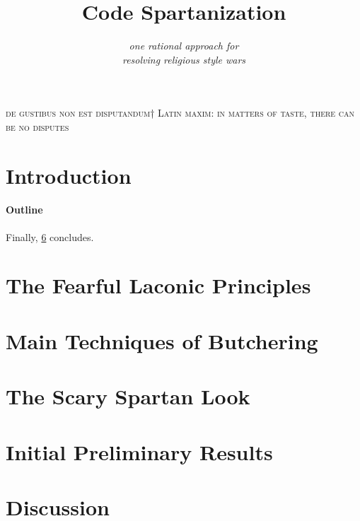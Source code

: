 \documentclass[preprint,10pt,nonatbib]{sigplanconf}
\title{Code Spartanization}
\subtitle{\scriptsize \emph{one rational approach for\\ resolving religious style wars}}
\begin{document}
\textsc{de gustibus non est disputandum†{%
    Latin maxim: in matters of taste, there can be no disputes
}}
{\let\newpage\relax\maketitle}

\begin{abstract}
  
\end{abstract}

\section{Introduction}


\paragraph{Outline}
\label{section:principia}
\label{section:techniques}
\label{section:look}
\label{section:jack}
\label{section:look}
\label{section:initial}
\label{section:zz}
Finally, \cref{section:zz} concludes.

\section{The Fearful Laconic Principles}
\label{section:principia}


\section{Main Techniques of Butchering}
\label{section:techniques}


\section{The Scary Spartan Look}
\label{section:look}


\section{Initial Preliminary Results}
\label{section:initial}


% 

\section{Discussion}
\label{section:zz}

\balance
\small

\end{document}
